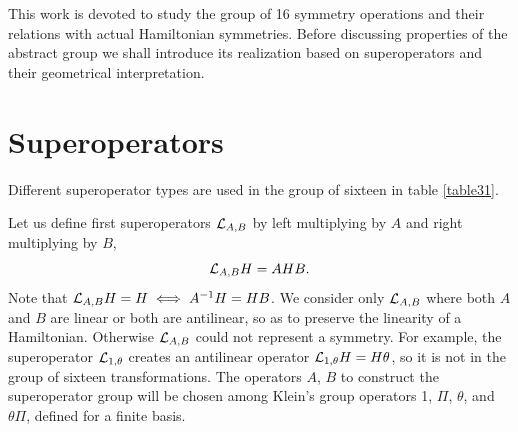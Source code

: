





This work is devoted to study the group of 16 symmetry operations and their relations with actual Hamiltonian symmetries.
Before discussing properties of the abstract group we shall introduce its  realization based on superoperators and their geometrical interpretation.
%
%
%
%
%
%
%
\section{Superoperators\label{supo}}
%
%
%
%
%
Different superoperator types are used in the group of sixteen in table \ref{table31}.

Let us define first  superoperators ${\cal L}_{A,B}$ by  left multiplying  by $A$ and right multiplying by
$B$,
%
\begin{equation}
{\cal{L}}_{A,B}H=AHB.
\end{equation}
%
Note that ${\cal{L}}_{A,B}H=H \iff A^{-1}H=HB$.
%
We consider only ${\cal{L}}_{A,B}$ where both $A$ and $B$ are  linear or both are antilinear, so as to preserve the linearity of a Hamiltonian. Otherwise ${\cal{L}}_{A,B}$ could not represent a symmetry. For example, the superoperator ${\cal{L}}_{1,\theta}$ creates an antilinear operator ${\cal{L}}_{1,\theta}H=H\theta$, so it is not in the  group of sixteen transformations.
The operators $A$, $B$ to construct  the  superoperator group will be chosen among  Klein's group operators
1, $\Pi$, $\theta$, and $\theta\Pi$, defined for a finite basis.

